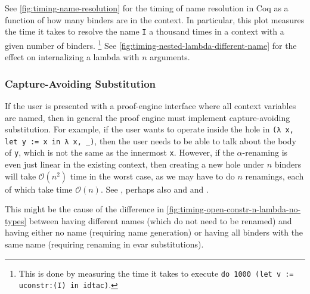 See \autoref{fig:timing-name-resolution} for the timing of name resolution in Coq as a function of how many binders are in the context.
In particular, this plot measures the time it takes to resolve the name \texttt{I} a thousand times in a context with a given number of binders.%
\footnote{%
  This is done by measuring the time it takes to execute \texttt{do 1000 (let v := uconstr:(I) in idtac)}.
}
See \autoref{fig:timing-nested-lambda-different-name} for the effect on internalizing a lambda with $n$ arguments.


%

\subsubsection{Capture-Avoiding Substitution} \label{sec:perf:capture-avoiding-subst}
If the user is presented with a proof-engine interface where all context variables are named, then in general the proof engine must implement capture-avoiding substitution.
For example, if the user wants to operate inside the hole in \texttt{(λ x, let y := x in λ x, _)}, then the user needs to be able to talk about the body of \texttt{y}, which is not the same as the innermost \texttt{x}.
However, if the $\alpha$-renaming is even just linear in the existing context, then creating a new hole under $n$ binders will take $\mathcal{O}(n^2)$ time in the worst case, as we may have to do $n$ renamings, each of which take time $\mathcal O(n)$.
See , perhaps also  and  and .


This might be the cause of the difference in \autoref{fig:timing-open-constr-n-lambda-no-types} between having different names (which do not need to be renamed) and having either no name (requiring name generation) or having all binders with the same name (requiring renaming in evar substitutions).

%
%

